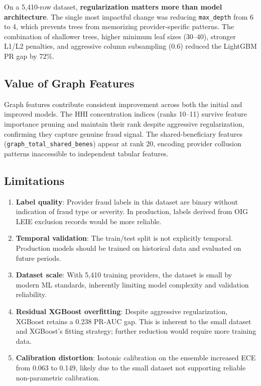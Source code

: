 \documentclass[conference]{IEEEtran}
\begin{document}
On a 5,410-row dataset, \textbf{regularization matters more than model architecture}. The single most impactful change was reducing \texttt{max\_depth} from 6 to 4, which prevents trees from memorizing provider-specific patterns. The combination of shallower trees, higher minimum leaf sizes (30--40), stronger L1/L2 penalties, and aggressive column subsampling (0.6) reduced the LightGBM PR gap by 72\%.

\subsection{Value of Graph Features}

Graph features contribute consistent improvement across both the initial and improved models. The HHI concentration indices (ranks 10--11) survive feature importance pruning and maintain their rank despite aggressive regularization, confirming they capture genuine fraud signal. The shared-beneficiary features (\texttt{graph\_total\_shared\_benes}) appear at rank 20, encoding provider collusion patterns inaccessible to independent tabular features.

\subsection{Limitations}

\begin{enumerate}[leftmargin=*]
    \item \textbf{Label quality}: Provider fraud labels in this dataset are binary without indication of fraud type or severity. In production, labels derived from OIG LEIE exclusion records would be more reliable.
    \item \textbf{Temporal validation}: The train/test split is not explicitly temporal. Production models should be trained on historical data and evaluated on future periods.
    \item \textbf{Dataset scale}: With 5,410 training providers, the dataset is small by modern ML standards, inherently limiting model complexity and validation reliability.
    \item \textbf{Residual XGBoost overfitting}: Despite aggressive regularization, XGBoost retains a 0.238 PR-AUC gap. This is inherent to the small dataset and XGBoost's fitting strategy; further reduction would require more training data.
    \item \textbf{Calibration distortion}: Isotonic calibration on the ensemble increased ECE from 0.063 to 0.149, likely due to the small dataset not supporting reliable non-parametric calibration.
\end{enumerate}
\end{document}
